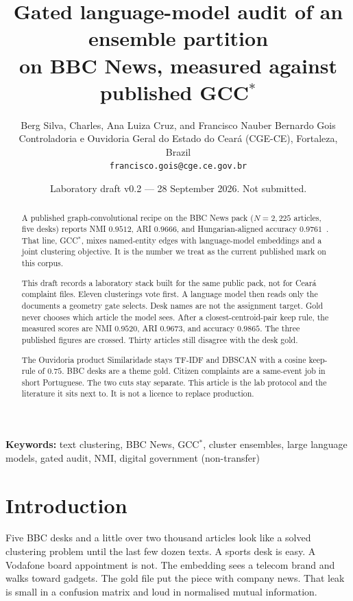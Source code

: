 \documentclass[11pt,a4paper]{article}
\title{Gated language-model audit of an ensemble partition\\
on BBC News, measured against published GCC$^*$}
\author{Berg Silva, Charles, Ana Luiza Cruz, and Francisco Nauber Bernardo Gois\\
Controladoria e Ouvidoria Geral do Estado do Cear\'{a} (CGE-CE), Fortaleza, Brazil\\
\texttt{francisco.gois@cge.ce.gov.br}}
\date{Laboratory draft v0.2 --- 28 September 2026. Not submitted.}
\begin{document}
\maketitle

\begin{abstract}
A published graph-convolutional recipe on the BBC News pack
($N=2{,}225$ articles, five desks) reports NMI $0.9512$, ARI $0.9666$,
and Hungarian-aligned accuracy $0.9761$~\cite{keraghel2024gcc}.
That line, GCC$^*$, mixes named-entity edges with language-model
embeddings and a joint clustering objective. It is the number we
treat as the current published mark on this corpus.

This draft records a laboratory stack built for the same public pack,
not for Cear\'{a} complaint files. Eleven clusterings vote first.
A language model then reads only the documents a geometry gate
selects. Desk names are not the assignment target. Gold never
chooses which article the model sees. After a closest-centroid-pair
keep rule, the measured scores are NMI $0.9520$, ARI $0.9673$, and
accuracy $0.9865$. The three published figures are crossed. Thirty
articles still disagree with the desk gold.

The Ouvidoria product Similaridade stays TF-IDF and DBSCAN with a
cosine keep-rule of $0.75$. BBC desks are a theme gold. Citizen
complaints are a same-event job in short Portuguese. The two cuts
stay separate. This article is the lab protocol and the literature
it sits next to. It is not a licence to replace production.
\end{abstract}

\noindent\textbf{Keywords:}
text clustering, BBC News, GCC$^*$, cluster ensembles, large language
models, gated audit, NMI, digital government (non-transfer)

\tableofcontents
\newpage

\section{Introduction}

Five BBC desks and a little over two thousand articles look like a
solved clustering problem until the last few dozen texts. A sports
desk is easy. A Vodafone board appointment is not. The embedding
sees a telecom brand and walks toward gadgets. The gold file put
the piece with company news. That leak is small in a confusion
matrix and loud in normalised mutual information.
\end{document}
